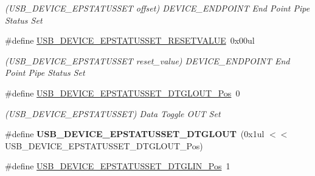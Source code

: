 \begin{DoxyCompactItemize}
\begin{DoxyCompactList}\small\item\em (U\+S\+B\+\_\+\+D\+E\+V\+I\+C\+E\+\_\+\+E\+P\+S\+T\+A\+T\+U\+S\+S\+E\+T offset) D\+E\+V\+I\+C\+E\+\_\+\+E\+N\+D\+P\+O\+I\+N\+T End Point Pipe Status Set \end{DoxyCompactList}\item 
\hypertarget{group___s_a_m_l21___u_s_b_ga170d43fd3b171ad61ecb97edef681e38}{}\#define \hyperlink{group___s_a_m_l21___u_s_b_ga170d43fd3b171ad61ecb97edef681e38}{U\+S\+B\+\_\+\+D\+E\+V\+I\+C\+E\+\_\+\+E\+P\+S\+T\+A\+T\+U\+S\+S\+E\+T\+\_\+\+R\+E\+S\+E\+T\+V\+A\+L\+U\+E}~0x00ul\label{group___s_a_m_l21___u_s_b_ga170d43fd3b171ad61ecb97edef681e38}

\begin{DoxyCompactList}\small\item\em (U\+S\+B\+\_\+\+D\+E\+V\+I\+C\+E\+\_\+\+E\+P\+S\+T\+A\+T\+U\+S\+S\+E\+T reset\+\_\+value) D\+E\+V\+I\+C\+E\+\_\+\+E\+N\+D\+P\+O\+I\+N\+T End Point Pipe Status Set \end{DoxyCompactList}\item 
\hypertarget{group___s_a_m_l21___u_s_b_ga01bd7218d0f27a8b6dc3fac4edc7407f}{}\#define \hyperlink{group___s_a_m_l21___u_s_b_ga01bd7218d0f27a8b6dc3fac4edc7407f}{U\+S\+B\+\_\+\+D\+E\+V\+I\+C\+E\+\_\+\+E\+P\+S\+T\+A\+T\+U\+S\+S\+E\+T\+\_\+\+D\+T\+G\+L\+O\+U\+T\+\_\+\+Pos}~0\label{group___s_a_m_l21___u_s_b_ga01bd7218d0f27a8b6dc3fac4edc7407f}

\begin{DoxyCompactList}\small\item\em (U\+S\+B\+\_\+\+D\+E\+V\+I\+C\+E\+\_\+\+E\+P\+S\+T\+A\+T\+U\+S\+S\+E\+T) Data Toggle O\+U\+T Set \end{DoxyCompactList}\item 
\hypertarget{group___s_a_m_l21___u_s_b_ga9dcdd36ec5a98b1b8f455dd611aa2672}{}\#define {\bfseries U\+S\+B\+\_\+\+D\+E\+V\+I\+C\+E\+\_\+\+E\+P\+S\+T\+A\+T\+U\+S\+S\+E\+T\+\_\+\+D\+T\+G\+L\+O\+U\+T}~(0x1ul $<$$<$ U\+S\+B\+\_\+\+D\+E\+V\+I\+C\+E\+\_\+\+E\+P\+S\+T\+A\+T\+U\+S\+S\+E\+T\+\_\+\+D\+T\+G\+L\+O\+U\+T\+\_\+\+Pos)\label{group___s_a_m_l21___u_s_b_ga9dcdd36ec5a98b1b8f455dd611aa2672}

\item 
\hypertarget{group___s_a_m_l21___u_s_b_gaea8e590e0f309924d37786d157f62ae8}{}\#define \hyperlink{group___s_a_m_l21___u_s_b_gaea8e590e0f309924d37786d157f62ae8}{U\+S\+B\+\_\+\+D\+E\+V\+I\+C\+E\+\_\+\+E\+P\+S\+T\+A\+T\+U\+S\+S\+E\+T\+\_\+\+D\+T\+G\+L\+I\+N\+\_\+\+Pos}~1\label{group___s_a_m_l21___u_s_b_gaea8e590e0f309924d37786d157f62ae8}


\end{DoxyCompactItemize}
